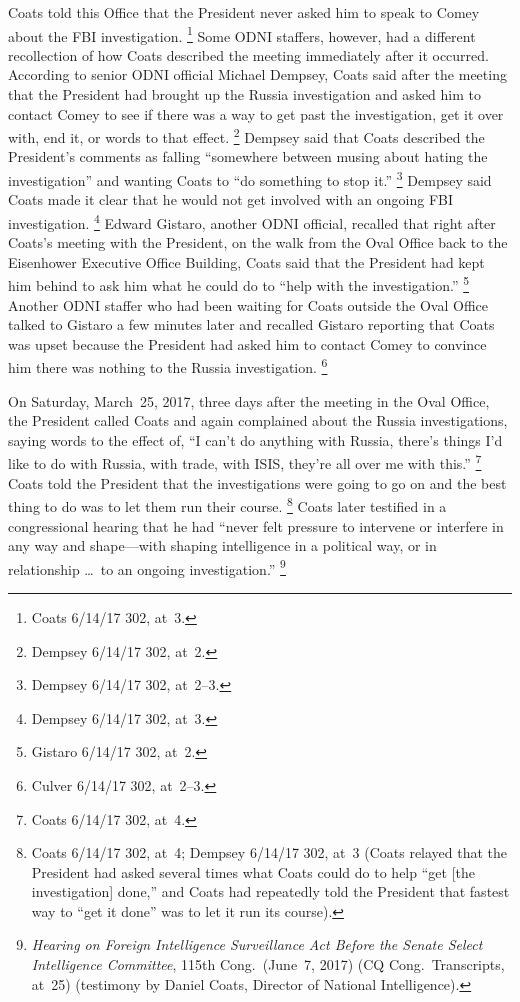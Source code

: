 Coats told this Office that the President never asked him to speak to Comey about the FBI investigation.%
\footnote{Coats 6/14/17 302, at~3.}
Some ODNI staffers, however, had a different recollection of how Coats described the meeting immediately after it occurred.
According to senior ODNI official Michael Dempsey, Coats said after the meeting that the President had brought up the Russia investigation and asked him to contact Comey to see if there was a way to get past the investigation, get it over with, end it, or words to that effect.%
\footnote{Dempsey 6/14/17 302, at~2.}
Dempsey said that Coats described the President's comments as falling ``somewhere between musing about hating the investigation'' and wanting Coats to ``do something to stop it.''%
\footnote{Dempsey 6/14/17 302, at~2--3.}
Dempsey said Coats made it clear that he would not get involved with an ongoing FBI investigation.%
\footnote{Dempsey 6/14/17 302, at~3.}
Edward Gistaro, another ODNI official, recalled that right after Coats's meeting with the President, on the walk from the Oval Office back to the Eisenhower Executive Office Building, Coats said that the President had kept him behind to ask him what he could do to ``help with the investigation.''%
\footnote{Gistaro 6/14/17 302, at~2.}
Another ODNI staffer who had been waiting for Coats outside the Oval Office talked to Gistaro a few minutes later and recalled Gistaro reporting that Coats was upset because the President had asked him to contact Comey to convince him there was nothing to the Russia investigation.%
\footnote{Culver 6/14/17 302, at~2--3.}

On Saturday, March~25, 2017, three days after the meeting in the Oval Office, the President called Coats and again complained about the Russia investigations, saying words to the effect of, ``I can't do anything with Russia, there's things I'd like to do with Russia, with trade, with ISIS, they're all over me with this.''%
\footnote{Coats 6/14/17 302, at~4.}
Coats told the President that the investigations were going to go on and the best thing to do was to let them run their course.%
\footnote{Coats 6/14/17 302, at~4;
Dempsey 6/14/17 302, at~3 (Coats relayed that the President had asked several times what Coats could do to help ``get [the investigation] done,'' and Coats had repeatedly told the President that fastest way to ``get it done'' was to let it run its course).}
Coats later testified in a congressional hearing that he had ``never felt pressure to intervene or interfere in any way and shape---with shaping intelligence in a political way, or in relationship \dots\ to an ongoing investigation.''%
\footnote{\textit{Hearing on Foreign Intelligence Surveillance Act Before the Senate Select Intelligence Committee}, 115th Cong.\ (June~7, 2017) (CQ Cong.\ Transcripts, at~25) (testimony by Daniel Coats, Director of National Intelligence).}

